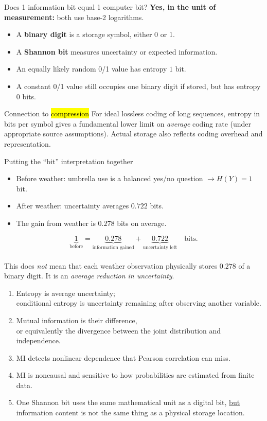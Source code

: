 \documentclass[aspectratio=43,11pt]{beamer}
\begin{document}
\begin{frame}{Does 1 information bit equal 1 computer bit?}
\textbf{Yes, in the unit of measurement:} both use base-2 logarithms.
\medskip
\begin{itemize}
\item A \textbf{binary digit} is a storage symbol, either 0 or 1.
\item A \textbf{Shannon bit} measures uncertainty or expected information.
\item An equally likely random 0/1 value has entropy $1$ bit.
\item A constant 0/1 value still occupies one binary digit if stored, but has entropy $0$ bits.
\end{itemize}
\medskip
\begin{block}{Connection to \hl{compression}}
For ideal lossless coding of long sequences, entropy in bits per symbol gives a fundamental lower limit on \emph{average} coding rate (under appropriate source assumptions). Actual storage also reflects coding overhead and representation.
\end{block}
\end{frame}

\begin{frame}{Putting the ``bit'' interpretation together}
\begin{itemize}
\item Before weather: umbrella use is a balanced yes/no question $\rightarrow H(Y)=1$ bit.
\item After weather: uncertainty averages $0.722$ bits.
\item The gain from weather is $0.278$ bits on average.
\end{itemize}
\medskip
\[
\underbrace{1}_{\text{before}}
=\underbrace{0.278}_{\text{information gained}}
+\underbrace{0.722}_{\text{uncertainty left}}
\quad\text{bits}.
\]\\
\medskip
This does \emph{not} mean that each weather observation physically stores $0.278$ of a binary digit. It is an \emph{average reduction in uncertainty}.
\end{frame}

\begin{frame}{}
\begin{enumerate}
\item Entropy is average uncertainty;\\
      conditional entropy is uncertainty remaining after observing another variable.
\item Mutual information is their difference,\\
      or equivalently the divergence between the joint distribution and independence.
\item MI detects nonlinear dependence that Pearson correlation can miss.
\item MI is noncausal and sensitive to how probabilities are estimated from finite data.
\item One Shannon bit uses the same mathematical unit as a digital bit, \ul{but} information content is not the same thing as a physical storage location.
\end{enumerate}
\end{frame}
\end{document}
